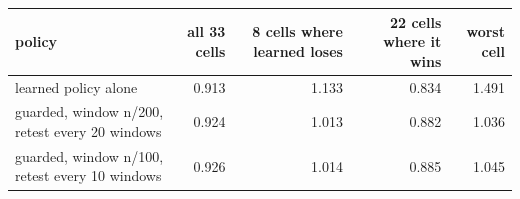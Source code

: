 \begin{tabular}{lrrrr}
\toprule
policy & all 33 cells & 8 cells where learned loses & 22 cells where it wins & worst cell \\
\midrule
learned policy alone & 0.913 & 1.133 & 0.834 & 1.491 \\
guarded, window n/200, retest every 20 windows & 0.924 & 1.013 & 0.882 & 1.036 \\
guarded, window n/100, retest every 10 windows & 0.926 & 1.014 & 0.885 & 1.045 \\
\bottomrule
\end{tabular}
